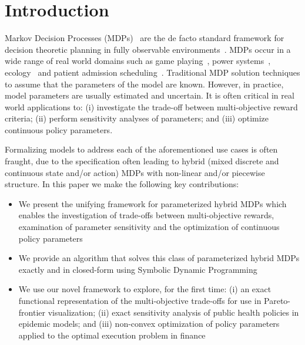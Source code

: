 \section{Introduction}
\label{sec:introduction}

Markov Decision Processes (MDPs)~\parencite{Howard_MIT_1960} are the de facto standard framework for decision theoretic
planning in fully observable environments~\parencite{Boutilier_JAIR_1999}. MDPs occur in a wide range of real world domains such as game playing~\parencite{Szita_RL_2012}, power systems~\parencite{Reddy_IJCAI_2011}, ecology~\parencite{Williams_EM_2009} and patient admission scheduling~\parencite{Zhu_AIM_2014}. Traditional MDP solution techniques to assume that the parameters of the model are known. However, in practice, model parameters are usually estimated and uncertain. It is often critical in real world applications to: (i) investigate the trade-off between multi-objective reward criteria; (ii) perform sensitivity analyses of parameters; and (iii) optimize continuous policy parameters.

Formalizing models to address each of the aforementioned use cases is often fraught, due to the specification often leading to 
hybrid (mixed discrete and continuous state and/or action) MDPs with non-linear and/or piecewise structure. In this paper we make the following key contributions:
\begin{itemize}
    \item We present the unifying framework for parameterized hybrid MDPs which enables the investigation of trade-offs between multi-objective rewards, examination of parameter sensitivity and the optimization of continuous policy parameters 
    \item We provide an algorithm that solves this class of parameterized hybrid MDPs exactly and in closed-form using Symbolic Dynamic Programming~\parencite{Boutilier_IJCAI_2001}
    \item We use our novel framework to explore, for the first time: (i) an exact functional representation of the multi-objective trade-offs for use in Pareto-frontier visualization; (ii) exact sensitivity analysis of public health policies in epidemic models; and (iii) non-convex optimization of policy parameters applied to the optimal execution problem in finance
\end{itemize}


